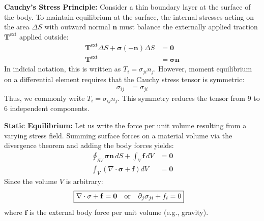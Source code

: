 \textbf{Cauchy's Stress Principle:}
Consider a thin boundary layer at the surface of the body. To maintain equilibrium at the surface, the internal stresses acting on the area $\Delta S$ with outward normal $\mathbf{n}$ must balance the externally applied traction $\mathbf{T}^{\text{ext}}$ applied outside:
\begin{align}
    \mathbf{T}^{\text{ext}} \Delta S + \mathbf{\sigma} (-\mathbf{n}) \Delta S &= \mathbf{0} \nonumber \\
    \mathbf{T}^{\text{ext}} &= \mathbf{\sigma} \mathbf{n} 
\end{align}
In indicial notation, this is written as $T_i = \sigma_{ji} n_j$. However, moment equilibrium on a differential element requires that the Cauchy stress tensor is symmetric:
\begin{align}
    \sigma_{ij} &= \sigma_{ji}
\end{align}
Thus, we commonly write $T_i = \sigma_{ij} n_j$. This symmetry reduces the tensor from 9 to 6 independent components.

\textbf{Static Equilibrium:}
Let us write the force per unit volume resulting from a varying stress field. Summing surface forces on a material volume via the divergence theorem and adding the body forces yields:
\begin{align}
    \oint_{\partial V} \mathbf{\sigma} \mathbf{n} \, dS + \int_V \mathbf{f} \, dV &= \mathbf{0} \nonumber \\
    \int_V \left( \nabla \cdot \mathbf{\sigma} + \mathbf{f} \right) dV &= \mathbf{0}
\end{align}
Since the volume $V$ is arbitrary:
\begin{align}
    \Aboxed{ \nabla \cdot \mathbf{\sigma} + \mathbf{f} &= \mathbf{0} \quad \text{or} \quad \partial_j \sigma_{ji} + f_i = 0 }
\end{align}
where $\mathbf{f}$ is the external body force per unit volume (e.g., gravity).

